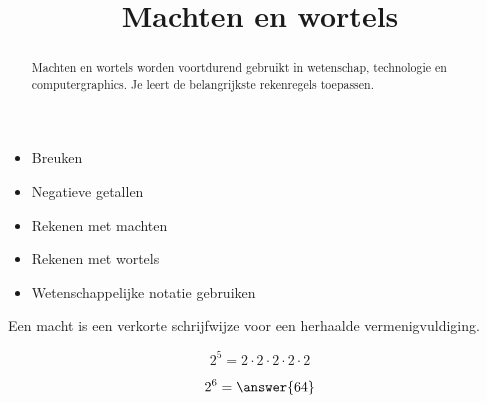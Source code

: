 \documentclass{ximera}
\title{Machten en wortels}
\begin{document}
\begin{abstract}
Machten en wortels worden voortdurend gebruikt in wetenschap, technologie en computergraphics. Je leert de belangrijkste rekenregels toepassen.
\end{abstract}

\maketitle


\begin{itemize}
\item Breuken
\item Negatieve getallen
\end{itemize}


\begin{itemize}
\item Rekenen met machten
\item Rekenen met wortels
\item Wetenschappelijke notatie gebruiken
\end{itemize}



Een macht is een verkorte schrijfwijze voor een herhaalde vermenigvuldiging.

\[
2^5=2\cdot2\cdot2\cdot2\cdot2
\]

\begin{exercise}

\[
2^6=\answer{64}
\]

\end{exercise}
\end{document}
